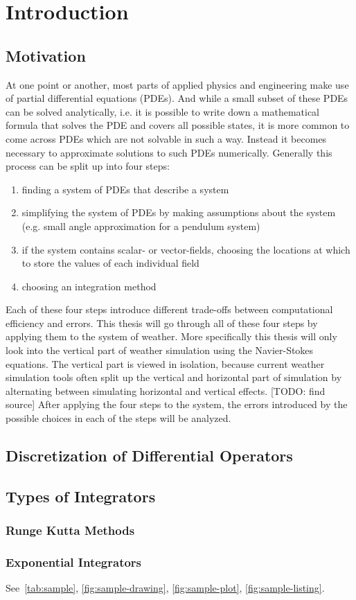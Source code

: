 
\chapter{Introduction}\label{chapter:introduction}

\section{Motivation}
At one point or another, most parts of applied physics and engineering make use of partial differential equations (PDEs).
And while a small subset of these PDEs can be solved analytically, i.e. it is possible to write down a mathematical formula that solves the PDE and covers all possible states, it is more common to come across PDEs which are not solvable in such a way.
Instead it becomes necessary to approximate solutions to such PDEs numerically.
Generally this process can be split up into four steps:
\begin{enumerate}
\item finding a system of PDEs that describe a system
\item simplifying the system of PDEs by making assumptions about the system (e.g. small angle approximation for a pendulum system)
\item if the system contains scalar- or vector-fields, choosing the locations at which to store the values of each individual field
\item choosing an integration method
\end{enumerate}
Each of these four steps introduce different trade-offs between computational efficiency and errors.
This thesis will go through all of these four steps by applying them to the system of weather.
More specifically this thesis will only look into the vertical part of weather simulation using the Navier-Stokes equations.
The vertical part is viewed in isolation, because current weather simulation tools often split up the vertical and horizontal part of simulation by alternating between simulating horizontal and vertical effects. [TODO: find source]
After applying the four steps to the system, the errors introduced by the possible choices in each of the steps will be analyzed.

\section{Discretization of Differential Operators}

\section{Types of Integrators}
\subsection{Runge Kutta Methods}
\subsection{Exponential Integrators}

See~\autoref{tab:sample}, \autoref{fig:sample-drawing}, \autoref{fig:sample-plot}, \autoref{fig:sample-listing}.
